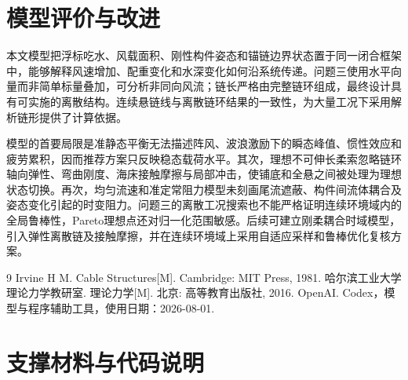 \documentclass[UTF8,zihao=-4,a4paper,fontset=fandol]{ctexart}
\begin{document}
\section{模型评价与改进}
本文模型把浮标吃水、风载面积、刚性构件姿态和锚链边界状态置于同一闭合框架中，能够解释风速增加、配重变化和水深变化如何沿系统传递。问题三使用水平向量而非简单标量叠加，可分析非同向风流；链长严格由完整链环组成，最终设计具有可实施的离散结构。连续悬链线与离散链环结果的一致性，为大量工况下采用解析链形提供了计算依据。

模型的首要局限是准静态平衡无法描述阵风、波浪激励下的瞬态峰值、惯性效应和疲劳累积，因而推荐方案只反映稳态载荷水平。其次，理想不可伸长柔索忽略链环轴向弹性、弯曲刚度、海床接触摩擦与局部冲击，使铺底和全悬之间被处理为理想状态切换。再次，均匀流速和准定常阻力模型未刻画尾流遮蔽、构件间流体耦合及姿态变化引起的时变阻力。问题三的离散工况搜索也不能严格证明连续环境域内的全局鲁棒性，Pareto理想点还对归一化范围敏感。后续可建立刚柔耦合时域模型，引入弹性离散链及接触摩擦，并在连续环境域上采用自适应采样和鲁棒优化复核方案。

\begin{thebibliography}{9}
 Irvine H M. Cable Structures[M]. Cambridge: MIT Press, 1981.
 哈尔滨工业大学理论力学教研室. 理论力学[M]. 北京: 高等教育出版社, 2016.
 OpenAI. Codex，模型与程序辅助工具，使用日期：2026-08-01.
\end{thebibliography}

\CumcmMainMatterEnd
\appendix
{}
\section{支撑材料与代码说明}
\end{document}
